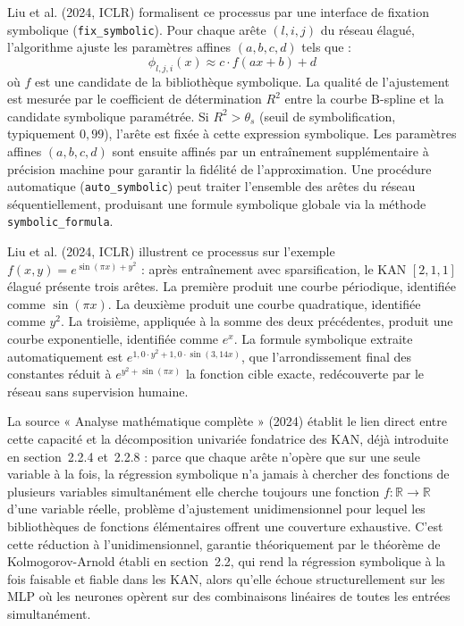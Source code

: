 \documentclass[11pt,a4paper,oneside]{report}
\theoremstyle{definition}
\theoremstyle{remark}
\begin{document}
Liu et al. (2024, ICLR) formalisent ce processus par une interface de fixation symbolique (\texttt{fix\_symbolic}). Pour chaque arête $(l, i, j)$ du réseau élagué, l'algorithme ajuste les paramètres affines $(a, b, c, d)$ tels que :
\begin{equation}
\phi_{l,j,i}(x) \approx c \cdot f(ax + b) + d
\end{equation}
où $f$ est une candidate de la bibliothèque symbolique. La qualité de l'ajustement est mesurée par le coefficient de détermination $R^2$ entre la courbe B-spline et la candidate symbolique paramétrée. Si $R^2 > \theta_s$ (seuil de symbolification, typiquement $0{,}99$), l'arête est fixée à cette expression symbolique. Les paramètres affines $(a, b, c, d)$ sont ensuite affinés par un entraînement supplémentaire à précision machine pour garantir la fidélité de l'approximation. Une procédure automatique (\texttt{auto\_symbolic}) peut traiter l'ensemble des arêtes du réseau séquentiellement, produisant une formule symbolique globale via la méthode \texttt{symbolic\_formula}.

Liu et al. (2024, ICLR) illustrent ce processus sur l'exemple $f(x,y) = e^{\sin(\pi x) + y^2}$ : après entraînement avec sparsification, le KAN $[2,1,1]$ élagué présente trois arêtes. La première produit une courbe périodique, identifiée comme $\sin(\pi x)$. La deuxième produit une courbe quadratique, identifiée comme $y^2$. La troisième, appliquée à la somme des deux précédentes, produit une courbe exponentielle, identifiée comme $e^x$. La formule symbolique extraite automatiquement est $e^{1{,}0 \cdot y^2 + 1{,}0 \cdot \sin(3{,}14x)}$, que l'arrondissement final des constantes réduit à $e^{y^2 + \sin(\pi x)}$  la fonction cible exacte, redécouverte par le réseau sans supervision humaine.

La source « Analyse mathématique complète » (2024) établit le lien direct entre cette capacité et la décomposition univariée fondatrice des KAN, déjà introduite en section~2.2.4 et~2.2.8 : parce que chaque arête n'opère que sur une seule variable à la fois, la régression symbolique n'a jamais à chercher des fonctions de plusieurs variables simultanément  elle cherche toujours une fonction $f : \mathbb{R} \rightarrow \mathbb{R}$ d'une variable réelle, problème d'ajustement unidimensionnel pour lequel les bibliothèques de fonctions élémentaires offrent une couverture exhaustive. C'est cette réduction à l'unidimensionnel, garantie théoriquement par le théorème de Kolmogorov-Arnold établi en section~2.2, qui rend la régression symbolique à la fois faisable et fiable dans les KAN, alors qu'elle échoue structurellement sur les MLP où les neurones opèrent sur des combinaisons linéaires de toutes les entrées simultanément.
\end{document}
